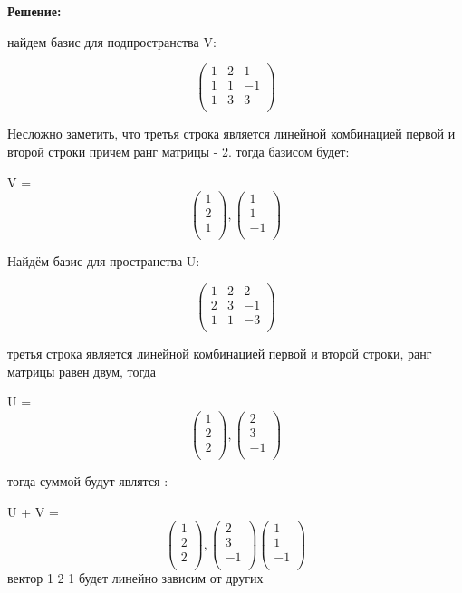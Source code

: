 \documentclass[a4paper,12pt]{article}
\begin{document}
\textbf{Решение:}

найдем базис для подпространства V:

\[
\begin{pmatrix}
    1 & 2 & 1 \\
    1 & 1 & -1 \\
    1 & 3 & 3 \\
\end{pmatrix}
\]

Несложно заметить, что третья строка является линейной комбинацией первой и второй строки причем ранг матрицы - 2. тогда базисом будет:

V = \[
\begin{pmatrix}
    1 \\
    2 \\
    1 \\
\end{pmatrix}, 
\begin{pmatrix}
    1 \\ 
    1 \\
    -1\\
\end{pmatrix}
\]

Найдём базис для пространства U:

\[
\begin{pmatrix}
    1 & 2 & 2 \\
    2 & 3 & -1 \\
    1 & 1 & -3\\
\end{pmatrix}
\]

третья строка является линейной комбинацией первой и второй строки, ранг матрицы равен двум, тогда

U = 
\[
\begin{pmatrix}
    1 \\
    2 \\
    2 \\
\end{pmatrix}, 
\begin{pmatrix}
    2 \\
    3 \\ 
    -1 \\
\end{pmatrix}
\]

тогда суммой будут являтся :

U + V = \[
\begin{pmatrix}
    1 \\
    2 \\
    2 \\
\end{pmatrix}, 
\begin{pmatrix}
    2 \\
    3 \\ 
    -1 \\
\end{pmatrix}
\begin{pmatrix}
    1 \\ 
    1 \\
    -1\\
\end{pmatrix}
\]
вектор 1 2 1 будет линейно зависим от других
\end{document}
